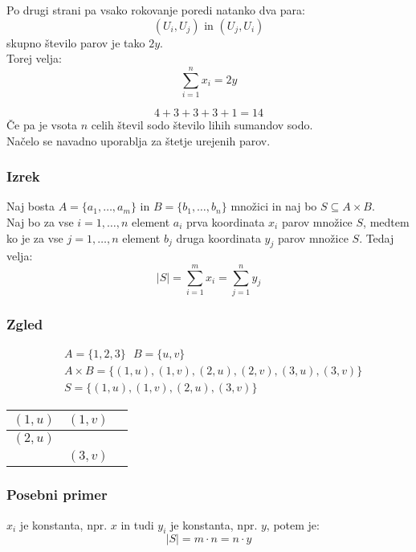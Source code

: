 \noindent
Po drugi strani pa vsako rokovanje poredi natanko dva para:
$$
(U_i, U_j) \text{ in } (U_j, U_i)
$$
skupno število parov je tako $2y$. \\

\noindent
Torej velja:
$$
\sum_{i = 1}^{n} x_i = 2y
$$

$$
4 + 3 + 3 + 3 + 1 = 14
$$
Če pa je vsota $n$ celih števil sodo število lihih sumandov sodo. \\

\noindent
Načelo se navadno uporablja za štetje urejenih parov.


\subsubsection{Izrek}
Naj bosta $A = \{ a_1, \dots, a_m \}$ in $B = \{ b_1, \dots, b_n \}$ množici in naj bo $S \subseteq A \times B$. \\
Naj bo za vse $i = 1, \dots, n$ element $a_i$ prva koordinata $x_i$ parov množice $S$, medtem ko je za vse $j = 1, \dots, n$ element $b_j$ druga koordinata $y_j$ parov množice $S$. Tedaj velja:
$$
|S| = \sum_{i = 1}^{m} x_i = \sum_{j = 1}^{n} y_j
$$


\subsubsection{Zgled}
\begin{align*}
    & A = \{ 1, 2, 3 \} \text{ } B = \{u, v\} \\[1em]
    & A \times B = \{ (1, u), (1, v), (2, u), (2, v), (3, u), (3,v) \} \\[1em]
    & S = \{ (1, u), (1, v), (2, u), (3, v) \}
\end{align*}
\begin{center}


    \begin{tabular}{|c|c|c|}
        \hline
        $(1, u)$ & $(1, v)$ \\  
        \hline
        $(2, u)$ &  \\
        \hline
        & $(3, v)$ \\ 
        \hline
    \end{tabular}    
\end{center}

\subsubsection{Posebni primer}
$x_i$ je konstanta, npr. $x$ in tudi $y_i$ je konstanta, npr. $y$, potem je:
$$
|S| = m \cdot n = n \cdot y
$$


